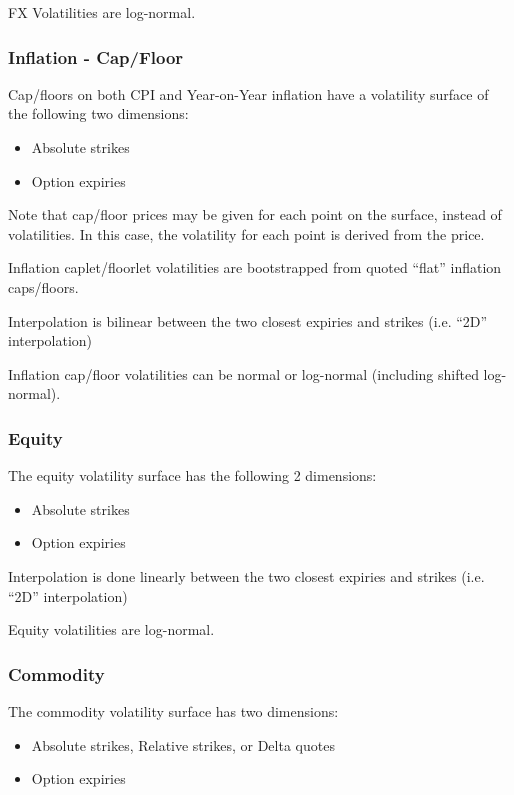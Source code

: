 \medskip
FX Volatilities are log-normal.

\subsubsection{Inflation - Cap/Floor}

Cap/floors on both CPI and Year-on-Year inflation have a volatility surface of 
the following two dimensions:
\begin{itemize}
\item Absolute strikes
\item Option expiries
\end{itemize}

Note that cap/floor prices may be given for each point on the surface, instead 
of volatilities. In this case, the volatility for each point is derived from 
the price.

\medskip
Inflation caplet/floorlet volatilities are bootstrapped from quoted ``flat'' 
inflation caps/floors.

\medskip
Interpolation is bilinear between the two closest expiries and strikes (i.e. 
``2D'' interpolation)

\medskip
Inflation cap/floor volatilities can be normal or log-normal (including shifted 
log-normal).

\subsubsection{Equity}
The equity volatility surface has the following 2 dimensions:
\begin{itemize}
\item Absolute strikes
\item Option expiries
\end{itemize}

Interpolation is done linearly between the two closest expiries and strikes (i.e. 
``2D'' interpolation)

\medskip
Equity volatilities are log-normal.

\subsubsection{Commodity}

The commodity volatility surface has two dimensions:
\begin{itemize}
\item Absolute strikes, Relative strikes, or Delta quotes
\item Option expiries
\end{itemize}

